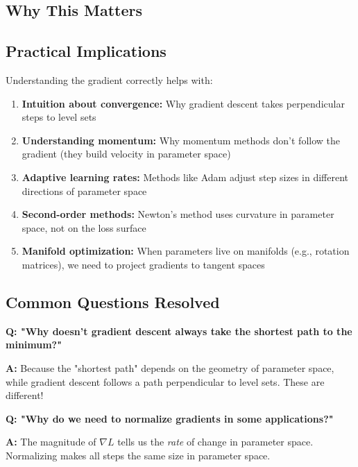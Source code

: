 \begin{notechapter}
\section{Why This Matters}

\subsection{Practical Implications}

Understanding the gradient correctly helps with:

\begin{enumerate}
    \item \textbf{Intuition about convergence:} Why gradient descent takes perpendicular steps to level sets
    
    \item \textbf{Understanding momentum:} Why momentum methods don't follow the gradient (they build velocity in parameter space)
    
    \item \textbf{Adaptive learning rates:} Methods like Adam adjust step sizes in different directions of parameter space
    
    \item \textbf{Second-order methods:} Newton's method uses curvature in parameter space, not on the loss surface
    
    \item \textbf{Manifold optimization:} When parameters live on manifolds (e.g., rotation matrices), we need to project gradients to tangent spaces
\end{enumerate}

\subsection{Common Questions Resolved}

\textbf{Q: "Why doesn't gradient descent always take the shortest path to the minimum?"}

\textbf{A:} Because the "shortest path" depends on the geometry of parameter space, while gradient descent follows a path perpendicular to level sets. These are different!

\textbf{Q: "Why do we need to normalize gradients in some applications?"}

\textbf{A:} The magnitude of $\nabla L$ tells us the \textit{rate} of change in parameter space. Normalizing makes all steps the same size in parameter space.


\end{notechapter}
